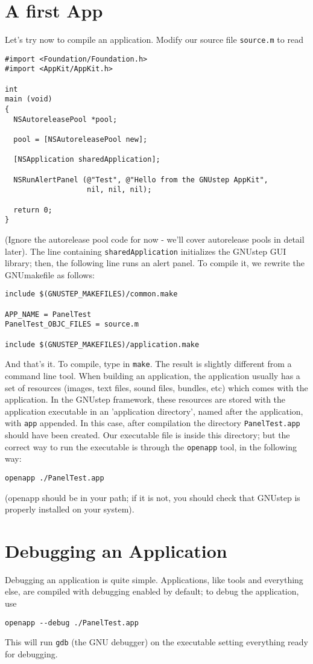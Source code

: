 \documentclass[a4paper]{article}
\begin{document}
\section{A first App}
Let's try now to compile an application. 
Modify our source file \texttt{source.m} to read 
\begin{verbatim}
#import <Foundation/Foundation.h>
#import <AppKit/AppKit.h>

int 
main (void)
{
  NSAutoreleasePool *pool;
  
  pool = [NSAutoreleasePool new];
  
  [NSApplication sharedApplication];
  
  NSRunAlertPanel (@"Test", @"Hello from the GNUstep AppKit", 
                   nil, nil, nil);

  return 0;
}
\end{verbatim}
(Ignore the autorelease pool code for now - we'll cover autorelease
pools in detail later).  The line containing
\texttt{sharedApplication} initializes the GNUstep GUI library; then,
the following line runs an alert panel.  To compile it, we rewrite the
GNUmakefile as follows:
\begin{verbatim}
include $(GNUSTEP_MAKEFILES)/common.make

APP_NAME = PanelTest
PanelTest_OBJC_FILES = source.m

include $(GNUSTEP_MAKEFILES)/application.make
\end{verbatim}
And that's it.  To compile, type in \texttt{make}.  
The result is slightly different from a command line tool.  
When building an application, the application usually has a set of
resources (images, text files, sound files, bundles, etc) which comes
with the application.  In the GNUstep framework, these resources are
stored with the application executable in an 'application directory',
named after the application, with \texttt{app} appended.  In this
case, after compilation the directory \texttt{PanelTest.app} should
have been created.
Our executable file is inside this directory; but the correct way to
run the executable is through the \texttt{openapp} tool, in the
following way:
\begin{verbatim}
openapp ./PanelTest.app
\end{verbatim}
(openapp should be in your path; if it is not, you should check that
GNUstep is properly installed on your system).

\section{Debugging an Application}
Debugging an application is quite simple.  Applications, like tools and
everything else, are compiled with debugging enabled by default; to
debug the application, use 
\begin{verbatim}
openapp --debug ./PanelTest.app
\end{verbatim}
This will run \texttt{gdb} (the GNU debugger) on the executable
setting everything ready for debugging.
\end{document}
